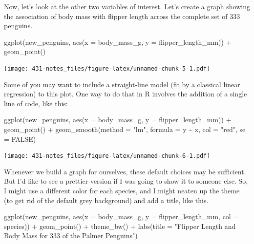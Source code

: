 \documentclass[
]{book}
\newenvironment{Shaded}{\begin{snugshade}}{\end{snugshade}}
\newcommand{\AttributeTok}[1]{\textcolor[rgb]{0.77,0.63,0.00}{#1}}
\newcommand{\ConstantTok}[1]{\textcolor[rgb]{0.00,0.00,0.00}{#1}}
\newcommand{\FunctionTok}[1]{\textcolor[rgb]{0.00,0.00,0.00}{#1}}
\newcommand{\NormalTok}[1]{#1}
\newcommand{\SpecialCharTok}[1]{\textcolor[rgb]{0.00,0.00,0.00}{#1}}
\newcommand{\StringTok}[1]{\textcolor[rgb]{0.31,0.60,0.02}{#1}}
\begin{document}
Now, let's look at the other two variables of interest. Let's create a graph showing the association of body mass with flipper length across the complete set of 333 penguins.

\begin{Shaded}
\begin{Highlighting}[]
\FunctionTok{ggplot}\NormalTok{(new\_penguins, }\FunctionTok{aes}\NormalTok{(}\AttributeTok{x =}\NormalTok{ body\_mass\_g, }\AttributeTok{y =}\NormalTok{ flipper\_length\_mm)) }\SpecialCharTok{+}
    \FunctionTok{geom\_point}\NormalTok{() }
\end{Highlighting}
\end{Shaded}

\texttt{[image: 431-notes\_files/figure-latex/unnamed-chunk-5-1.pdf]}

Some of you may want to include a straight-line model (fit by a classical linear regression) to this plot. One way to do that in R involves the addition of a single line of code, like this:

\begin{Shaded}
\begin{Highlighting}[]
\FunctionTok{ggplot}\NormalTok{(new\_penguins, }\FunctionTok{aes}\NormalTok{(}\AttributeTok{x =}\NormalTok{ body\_mass\_g, }\AttributeTok{y =}\NormalTok{ flipper\_length\_mm)) }\SpecialCharTok{+}
    \FunctionTok{geom\_point}\NormalTok{() }\SpecialCharTok{+}
    \FunctionTok{geom\_smooth}\NormalTok{(}\AttributeTok{method =} \StringTok{"lm"}\NormalTok{, }\AttributeTok{formula =}\NormalTok{ y }\SpecialCharTok{\textasciitilde{}}\NormalTok{ x,}
                \AttributeTok{col =} \StringTok{"red"}\NormalTok{, }\AttributeTok{se =} \ConstantTok{FALSE}\NormalTok{)}
\end{Highlighting}
\end{Shaded}

\texttt{[image: 431-notes\_files/figure-latex/unnamed-chunk-6-1.pdf]}

Whenever we build a graph for ourselves, these default choices may be sufficient. But I'd like to see a prettier version if I was going to show it to someone else. So, I might use a different color for each species, and I might neaten up the theme (to get rid of the default grey background) and add a title, like this.

\begin{Shaded}
\begin{Highlighting}[]
\FunctionTok{ggplot}\NormalTok{(new\_penguins, }\FunctionTok{aes}\NormalTok{(}\AttributeTok{x =}\NormalTok{ body\_mass\_g, }\AttributeTok{y =}\NormalTok{ flipper\_length\_mm, }\AttributeTok{col =}\NormalTok{ species)) }\SpecialCharTok{+}
    \FunctionTok{geom\_point}\NormalTok{() }\SpecialCharTok{+} 
    \FunctionTok{theme\_bw}\NormalTok{() }\SpecialCharTok{+} 
    \FunctionTok{labs}\NormalTok{(}\AttributeTok{title =} \StringTok{"Flipper Length and Body Mass for 333 of the Palmer Penguins"}\NormalTok{)}
\end{Highlighting}
\end{Shaded}
\end{document}
